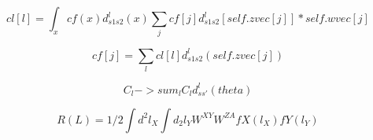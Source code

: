 \documentclass[11pt]{article}
\author{ketchup}
\date{\today}
\title{}
\begin{document}
\tableofcontents

\begin{equation}
cl[l] = \int_{x} cf(x) d^l_{s1 s2}(x)\sum_{j} cf[j] d^l_{s1 s2}[self.zvec[j]] * self.wvec[j]
\end{equation}

\begin{equation}
cf[j] = \sum_{l} cl[l] d^l_{s1 s2}(self.zvec[j])
\end{equation}

\begin{equation}
C_l -> sum_l C_l d^l_{ss'}(theta)
\end{equation}

\begin{equation}
R(L) = 1/2 \int{d^2 l_X} \int{d_2 l_Y}W^{XY} W^{ZA} fX(l_X) fY(l_Y)
\end{equation}
\end{document}
